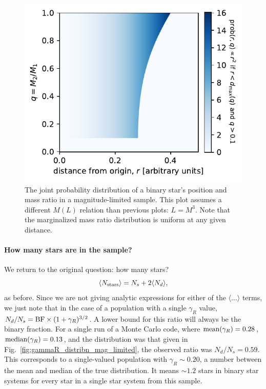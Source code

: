 \documentclass{emulateapj}
\begin{document}
\begin{figure}[!t]
	\begin{center}
		\includegraphics[scale=.8]{figures/joint_prob_r_q.pdf}
	\end{center}
	\caption{The joint probability distribution of a binary star's position and 
	mass ratio in a magnitude-limited sample. This plot assumes a different 
	$M(L)$ relation than previous plots: $L=M^3$. Note that the marginalized 
	mass ratio distribution is uniform at any given distance.}
	\label{fig:joint_prob_r_q}
\end{figure}

\paragraph{How many stars are in the sample?}

We return to the original question: how many stars?
\begin{equation}
\langle N_{\rm stars} \rangle = N_s + 2 \langle N_d \rangle,
\end{equation}
as before.
Since we are not giving analytic expressions for either of the $\langle \ldots 
\rangle$ terms, we just note that in the case of a population with a single 
$\gamma_R$ value, $N_d/N_s = {\rm BF} \times (1 + \gamma_R)^{3/2}$. A lower
bound for this ratio will always be the binary fraction.
For a single run of a Monte Carlo code, where ${\rm mean}(\gamma_R) = 0.28$, 
${\rm median}(\gamma_R) = 0.13$, and the distribution was that given in 
Fig.~\ref{fig:gammaR_distribn_mag_limited}, the observed ratio was $N_d/N_s = 
0.59$.
This corresponds to a single-valued population with $\gamma_R \sim 0.20$, a
number between the mean and median of the true distribution.
It means $\sim 1.2$ stars in binary star systems for every star in a single 
star system from this sample.
\end{document}
